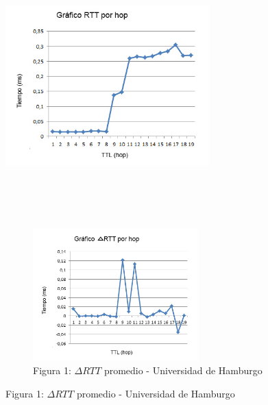 \begin{figure}[h]
	\begin{center}
    \includegraphics[width=0.7\textwidth]{img_analisis3/grafico-rtt-promedio.jpg} 
    \caption{Figura 1: $RTT$ promedio - Universidad de Hamburgo}	
	\end{center} 
\newpage
\\
\\
\\


\begin{figure}[h]
	\begin{center}
    \includegraphics[width=0.7\textwidth]{img_analisis3/grafico-delta-rtt-promedio.jpg} 
    \caption{Figura 1: $\Delta RTT$ promedio - Universidad de Hamburgo}	
	\end{center} 
\end{figure}
\newpage


\end{figure}
